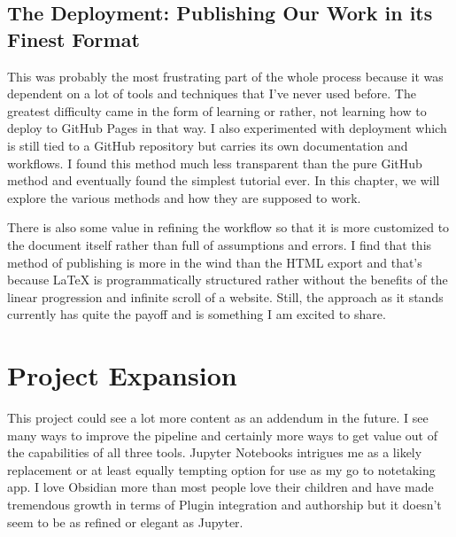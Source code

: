 \documentclass[letterpaper,12pt,english]{sphinxmanual}
\begin{document}
\subsection{The Deployment: Publishing Our Work in its Finest Format}
\label{\detokenize{_notebooks/00-the-goal:the-deployment-publishing-our-work-in-its-finest-format}}
\sphinxAtStartPar
This was probably the most frustrating part of the whole process because it was dependent on a lot of tools and techniques that I’ve never used before. The greatest difficulty came in the form of learning  \textendash{}or rather, not learning\textendash{} how to deploy to GitHub Pages in that way. I also experimented with  deployment which is still tied to a GitHub repository but carries its own documentation and workflows. I found this method much less transparent than the pure GitHub method and eventually found the simplest tutorial ever. In this chapter, we will explore the various methods and how they are supposed to work.

\sphinxAtStartPar
There is also some value in refining the  workflow so that it is more customized to the document itself rather than full of assumptions and errors. I find that this method of publishing is more in the wind than the HTML export and that’s because LaTeX is programmatically structured rather without the benefits of the linear progression and infinite scroll of a website. Still, the approach as it stands currently has quite the payoff and is something I am excited to share.


\section{Project Expansion}
\label{\detokenize{_notebooks/00-the-goal:project-expansion}}
\sphinxAtStartPar
This project could see a lot more content as an addendum in the future. I see many ways to improve the pipeline and certainly more ways to get value out of the capabilities of all three tools. Jupyter Notebooks intrigues me as a likely replacement \textendash{}or at least equally tempting option\textendash{} for use as my go to note\sphinxhyphen{}taking app. I love Obsidian more than most people love their children and have made tremendous growth in terms of Plugin integration and authorship but it doesn’t seem to be as refined or elegant as Jupyter.
\end{document}
